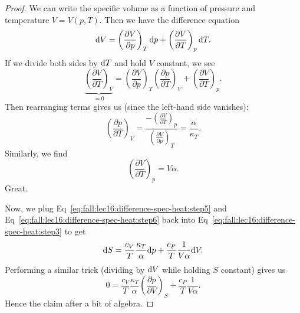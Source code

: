 \begin{proof}
We can write the specific volume as a function of pressure and
temperature $V=V(p,T)$. Then we have the difference equation
\begin{equation}
\mathrm{d} V = \left(\frac{\partial V}{\partial p}\right)_{T}\mathrm{d} p +  \left(\frac{\partial V}{\partial T}\right)_{p}\mathrm{d} T.
\end{equation}
If we divide both sides by $\mathrm{d} T$ and hold $V$ constant, we see
\begin{equation}
 \underbrace{\left(\frac{\partial V}{\partial T}\right)_{V}}_{=0}
= \left(\frac{\partial V}{\partial p}\right)_{T}\left(\frac{\partial p}{\partial T}\right)_{V} +  \left(\frac{\partial V}{\partial T}\right)_{p}.
\end{equation}
Then rearranging terms gives us (since the left-hand side vanishes):
\begin{equation}\label{eq:fall:lec16:difference-spec-heat:step5}
\left(\frac{\partial p}{\partial T}\right)_{V}
 = \frac{-\left(\frac{\partial V}{\partial T}\right)_{p}}{\left(\frac{\partial V}{\partial p}\right)_{T}}=\frac{\alpha}{\kappa_{T}}.
\end{equation}
Similarly, we find
\begin{equation}\label{eq:fall:lec16:difference-spec-heat:step6}
\left(\frac{\partial V}{\partial T}\right)_{p}
= V\alpha.
\end{equation}
Great.

Now, we plug Eq~\eqref{eq:fall:lec16:difference-spec-heat:step5} and Eq~\eqref{eq:fall:lec16:difference-spec-heat:step6}
back into Eq~\eqref{eq:fall:lec16:difference-spec-heat:step3}
to get
\begin{equation}
\mathrm{d} S = \frac{c_{V}}{T}\frac{\kappa_{T}}{\alpha}\mathrm{d} p + \frac{c_{P}}{T}\frac{1}{V\alpha}\mathrm{d} V.
\end{equation}
Performing a similar trick (dividing by $\mathrm{d} V$ while holding $S$
constant) gives us
\begin{equation}
0 = \frac{c_{V}}{T}\frac{\kappa_{T}}{\alpha}\left(\frac{\partial p}{\partial V}\right)_{S} + \frac{c_{P}}{T}\frac{1}{V\alpha}.
\end{equation}
Hence the claim after a bit of algebra.
\end{proof}

